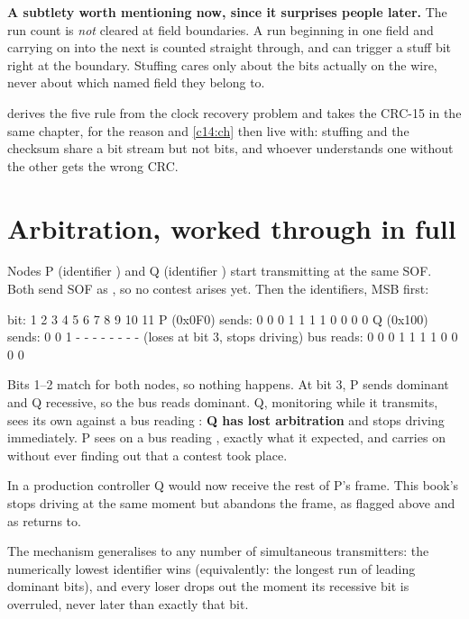 \begin{warning}
\textbf{A subtlety worth mentioning now, since it surprises people later.} The run count is
\emph{not} cleared at field boundaries. A run beginning in one field and carrying on into the next is
counted straight through, and can trigger a stuff bit right at the boundary. Stuffing cares only
about the bits actually on the wire, never about which named field they belong to.
\end{warning}

 derives the five rule from the clock recovery problem and takes the CRC-15 in the same
chapter, for the reason  and \ref{c14:ch} then live with: stuffing and the checksum
share a bit stream but not bits, and whoever understands one without the other gets the wrong CRC.

\section{Arbitration, worked through in full}
\label{c10:sec:arbitration}

Nodes P (identifier ) and Q (identifier ) start transmitting at the same SOF.
Both send SOF as , so no contest arises yet. Then the identifiers, MSB first:

\begin{textdrawing}
             bit:  1  2  3  4  5  6  7  8  9 10 11
 P (0x0F0) sends:  0  0  0  1  1  1  1  0  0  0  0
 Q (0x100) sends:  0  0  1  -  -  -  -  -  -  -  -   (loses at bit 3, stops driving)
       bus reads:  0  0  0  1  1  1  1  0  0  0  0
\end{textdrawing}

Bits 1--2 match for both nodes, so nothing happens. At bit 3, P sends dominant and Q recessive, so
the bus reads dominant. Q, monitoring while it transmits, sees its own  against a bus reading
: \textbf{Q has lost arbitration} and stops driving immediately. P sees  on a bus
reading , exactly what it expected, and carries on without ever finding out that a contest
took place.

In a production controller Q would now receive the rest of P's frame. This book's
 stops driving at the same moment but abandons the frame, as flagged above and
as  returns to.

The mechanism generalises to any number of simultaneous transmitters: the numerically lowest
identifier wins (equivalently: the longest run of leading dominant bits), and every loser drops out
the moment its recessive bit is overruled, never later than exactly that bit.

